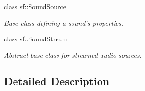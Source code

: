 \begin{DoxyCompactItemize}
class \hyperlink{classsf_1_1_sound_source}{sf\-::\-Sound\-Source}
\begin{DoxyCompactList}\small\item\em Base class defining a sound's properties. \end{DoxyCompactList}\item 
class \hyperlink{classsf_1_1_sound_stream}{sf\-::\-Sound\-Stream}
\begin{DoxyCompactList}\small\item\em Abstract base class for streamed audio sources. \end{DoxyCompactList}\end{DoxyCompactItemize}


\subsection{Detailed Description}
